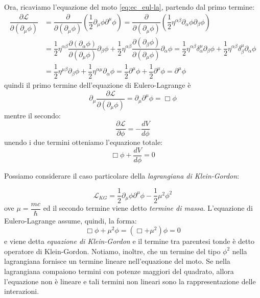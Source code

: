 Ora, ricaviamo l'equazione del moto \eqref{eq:ec_eul-la}, partendo dal primo termine:
\begin{equation}
\begin{aligned}
    \dfrac{\partial \mathcal{L}}{\partial(\partial_\mu\phi)}&=\dfrac{\partial }{\partial(\partial_\mu\phi)}\left(\dfrac{1}{2}\partial_\mu\phi\partial^\mu\phi\right)=\dfrac{\partial }{\partial(\partial_\mu\phi)}\left(\dfrac{1}{2}\eta^{\alpha\beta}\partial_\alpha\phi\partial_\beta\phi\right)\\
    &=\dfrac{1}{2}\eta^{\alpha\beta}\dfrac{\partial (\partial_\alpha\phi)}{\partial(\partial_\mu\phi)}\partial_\beta\phi+\dfrac{1}{2}\eta^{\alpha\beta}\dfrac{\partial (\partial_\beta\phi)}{\partial(\partial_\mu\phi)}\partial_\alpha\phi=\dfrac{1}{2}\eta^{\alpha\beta}\delta^\mu_\alpha\partial_\beta\phi+\dfrac{1}{2}\eta^{\alpha\beta}\delta^\mu_\beta\partial_\alpha\phi\\
    &=\dfrac{1}{2}\eta^{\mu\beta}\partial_\beta\phi+\dfrac{1}{2}\eta^{\alpha\mu}\partial_\alpha\phi=\dfrac{1}{2}\partial^\mu\phi+\dfrac{1}{2}\partial^\mu\phi=\partial^\mu\phi
\end{aligned}
\end{equation}
quindi il primo termine dell'equazione di Eulero-Lagrange è
\begin{equation}
   \partial_\mu \dfrac{\partial \mathcal{L}}{\partial(\partial_\mu\phi)}=\partial_\mu\partial^\mu\phi=\Box \phi
\end{equation}
mentre il secondo:
\begin{equation}
\dfrac{\partial \mathcal{L}}{\partial\phi}=-\dfrac{dV}{d\phi}
\end{equation}
unendo i due termini otteniamo l'equazione totale:
\begin{equation}
   \Box \phi+\dfrac{dV}{d\phi}=0
\end{equation}

Possiamo considerare il caso particolare della \textit{lagrangiana di Klein-Gordon}:

\begin{equation}
  \mathcal{L}_{KG}=\dfrac{1}{2}\partial_\mu\phi\partial^\mu\phi-\dfrac{1}{2}\mu^2\phi^2
\end{equation}
ove $\mu=\dfrac{mc}{\hbar}$ ed il secondo termine viene detto \textit{termine di massa}.
L'equazione di Eulero-Lagrange assume, quindi, la forma:
\begin{equation}
   \Box \phi+\mu^2\phi=(\Box+\mu^2)\phi=0
\end{equation}
e viene detta \textit{equazione di Klein-Gordon} e il termine tra parentesi tonde è detto operatore di Klein-Gordon. Notiamo, inoltre, che un termine del tipo $\phi^2$ nella lagrangiana fornisce un termine lineare nell'equazione del moto. Se nella lagrangiana compaiono termini con potenze maggiori del quadrato, allora l'equazione non è lineare e tali termini non lineari sono la rappresentazione delle interazioni.

